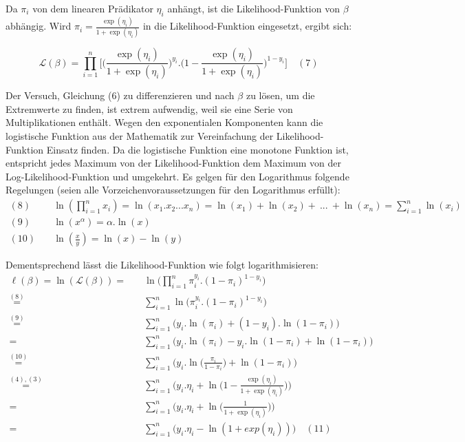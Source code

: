 \documentclass[12pt,]{article}
\begin{document}
Da \(\pi_i\) von dem linearen Prädikator \(\eta_i\) anhängt, ist die
Likelihood-Funktion von \(\beta\) abhängig. Wird
\(\pi_i = \frac{\exp(\eta_i)}{1 + \exp(\eta_i)}\) in die
Likelihood-Funktion eingesetzt, ergibt sich:

\[
\mathcal{L}(\beta) = {\prod_{i=1}^{n} \Bigg[ \Big( \frac{\exp(\eta_i)}{1 + \exp(\eta_i)} \Big)^{y_i}.\Big(1-\frac{\exp(\eta_i)}{1 + \exp(\eta_i)}\Big)^{1-y_i}}\Bigg] \quad (7)
\]

Der Versuch, Gleichung (6) zu differenzieren und nach \(\beta\) zu
lösen, um die Extremwerte zu finden, ist extrem aufwendig, weil sie eine
Serie von Multiplikationen enthält. Wegen den exponentialen Komponenten
kann die logistische Funktion aus der Mathematik zur Vereinfachung der
Likelihood-Funktion Einsatz finden. Da die logistische Funktion eine
monotone Funktion ist, entspricht jedes Maximum von der
Likelihood-Funktion dem Maximum von der Log-Likelihood-Funktion und
umgekehrt. Es gelgen für den Logarithmus folgende Regelungen (seien alle
Vorzeichenvoraussetzungen für den Logarithmus erfüllt): \[
\begin{aligned}
(8) \quad &\ln(\prod_{i=1}^{n}x_i) = \ln(x_1.x_2...x_n) = \ln(x_1) + \ln(x_2) + \ ... \ + \ln(x_n) = \sum_{i=1}^{n} \ln(x_i) \\
(9) \quad &\ln(x^\alpha) = \alpha.\ln(x) \\
(10) \quad &\ln(\frac{x}{y}) = \ln(x) - \ln(y)
\end{aligned} 
\]

Dementsprechend lässt die Likelihood-Funktion wie folgt
logarithmisieren: \[
\begin{aligned}
\ell(\beta) = \ln(\mathcal{L}(\beta)) = \quad &\ln \Bigg( \prod_{i=1}^{n} \pi_i^{y_i}.(1-\pi_i)^{1-y_i} \Bigg) \\
\mathrel{\overset{(8)}{=}} \quad &\sum_{i = 1}^{n} \ln \Big(\pi_i^{y_i}.(1-\pi_i)^{1-y_i}\Big) \\
\mathrel{\overset{(9)}{=}} \quad &\sum_{i = 1}^{n} \Big( y_i.\ln(\pi_i) + (1-y_i).\ln(1-\pi_i) \Big) \\
= \quad &\sum_{i = 1}^{n} \Big( y_i.\ln(\pi_i) - y_i.\ln(1-\pi_i) + \ln(1-\pi_i) \Big) \\
\mathrel{\overset{(10)}{=}} \quad &\sum_{i = 1}^{n} \Bigg( y_i.\ln \Big(\frac{\pi_i}{1-\pi_i}\Big) + \ln(1-\pi_i) \Bigg) \\
\mathrel{\overset{(4),(3)}{=}} \ &\sum_{i = 1}^{n} \Bigg( y_i.\eta_i + \ln \Big( 1- \frac{\exp(\eta_i)}{1 + \exp(\eta_i)} \Big) \Bigg) \\
= \quad &\sum_{i = 1}^{n} \Bigg( y_i.\eta_i + \ln \Big( \frac{1}{1+\exp(\eta_i)}\Big) \Bigg) \\
= \quad &\sum_{i = 1}^{n} \Big( y_i.\eta_i - \ln (1 + exp(\eta_i)) \Big) \quad (11)
\end{aligned}
\]
\end{document}
